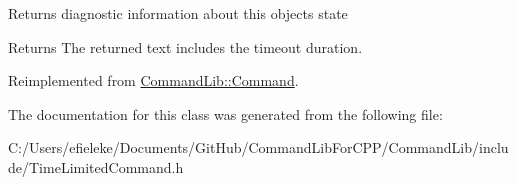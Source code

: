 Returns diagnostic information about this object\textquotesingle{}s state 

\begin{DoxyReturn}{Returns}
The returned text includes the timeout duration. 
\end{DoxyReturn}


Reimplemented from \mbox{\hyperlink{class_command_lib_1_1_command_a795a185509e7b0fc1606b3b62fe17fbb}{Command\+Lib\+::\+Command}}.



The documentation for this class was generated from the following file\+:\begin{DoxyCompactItemize}
\item 
C\+:/\+Users/efieleke/\+Documents/\+Git\+Hub/\+Command\+Lib\+For\+C\+P\+P/\+Command\+Lib/include/Time\+Limited\+Command.\+h\end{DoxyCompactItemize}

